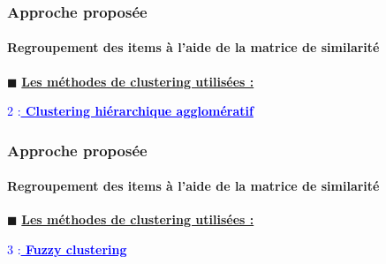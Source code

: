 \documentclass[aspectratio=169,professionalfonts, 12pt]{beamer}
\begin{document}
\begin{frame}
  \frametitle{Approche proposée}
  \framesubtitle{Regroupement des items à l’aide de la matrice de similarité}
  \(\displaystyle \blacksquare \) \textbf{\underline{Les méthodes de clustering utilisées :}} \\
  \justifying 
  \begin{minipage}{\textwidth}
    \vspace{2em}
  \hspace{3em} \textcolor{blue}{ 2 :\textbf{\underline{ Clustering hiérarchique agglomératif}}}
  \end{minipage}
\end{frame}

\begin{frame}
  \justifying
  \begin{minipage}{\textwidth}
    \begin{figure}[H]
      \centering
        \qquad
    \end{figure}
  \end{minipage}
\end{frame}

\begin{frame}
  \frametitle{Approche proposée}
  \framesubtitle{Regroupement des items à l’aide de la matrice de similarité}
  \(\displaystyle \blacksquare \) \textbf{\underline{Les méthodes de clustering utilisées :}} \\
  \justifying 
  \begin{minipage}{\textwidth}
    \vspace{2em}
  \hspace{3em} \textcolor{blue}{ 3 :\textbf{\underline{ Fuzzy clustering}}}
  \end{minipage}
\end{frame}
\end{document}

